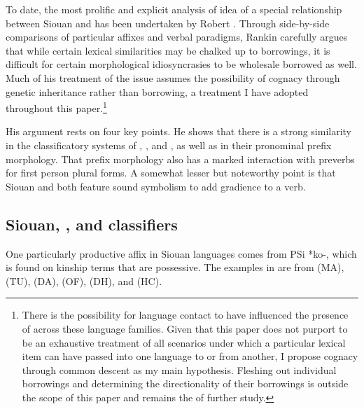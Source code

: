 \documentclass[output=paper]{LSP/langsci}
\begin{document}
To date, the most prolific and explicit analysis of  idea of a special relationship between Siouan and  has been undertaken by Robert \citet{Rankin1996,Rankin1998scy}. Through side-by-side comparisons of particular affixes and verbal paradigms, Rankin carefully argues that while certain lexical similarities may be chalked up to borrowings, it is difficult for certain morphological idiosyncrasies to be wholesale borrowed as well. Much of his treatment of the issue assumes the possibility of cognacy through genetic inheritance rather than borrowing, a treatment I have adopted throughout this paper.\footnote{There is the possibility for language contact to have influenced the presence of  across these language families. Given that this paper does not purport to be an exhaustive treatment of all scenarios under which a particular lexical item can have passed into one language to or from another, I propose cognacy through common descent as my main hypothesis. Fleshing out individual borrowings and determining the directionality of their borrowings is outside the scope of this paper and remains the  of further study.}

His argument rests on four key points. He shows that there is a strong similarity in the classificatory systems of , , and , as well as in their pronominal prefix morphology. That prefix morphology also has a marked interaction with preverbs for first person plural forms. A somewhat lesser but noteworthy point is that Siouan and  both feature  sound symbolism to add gradience to a verb.

\subsection{Siouan, , and  classifiers}

One particularly productive affix in Siouan languages comes from PSi *ko-, which is found on kinship terms that are possessive. The examples in  are from  (MA),  (TU),  (DA),  (OF),  (DH), and  (HC).

\begin{table} 
\end{table}
\end{document}
